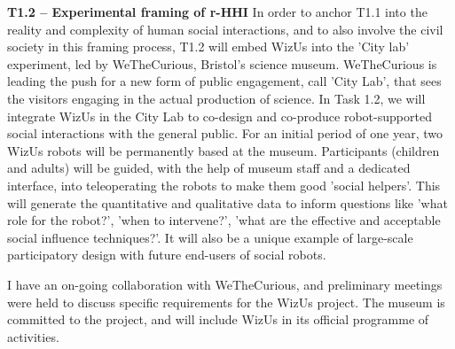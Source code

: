 \documentclass[11pt,a4paper]{report}
\newcommand{\project}{WizUs\xspace}
\begin{document}
\textbf{T1.2 -- Experimental framing of r-HHI} In order to anchor T1.1 into the
reality and complexity of human social interactions, and to also involve the
civil society in this framing process, T1.2 will embed \project into the 'City
lab' experiment, led by WeTheCurious, Bristol's science museum. WeTheCurious is
leading the push for a new form of public engagement, call 'City Lab', that sees
the visitors engaging in the actual production of science. In Task 1.2, we will
integrate \project in the City Lab to co-design and co-produce robot-supported
social interactions with the general public. For an initial period of one year,
two \project robots will be permanently based at the museum.  Participants
(children and adults) will be guided, with the help of museum staff and a
dedicated interface, into teleoperating the robots to make them good 'social
helpers'. This will generate the quantitative and qualitative data to inform
questions like 'what role for the robot?', 'when to intervene?', 'what are the
effective and acceptable social influence techniques?'. It will also be a unique
example of large-scale participatory design with future end-users of social
robots.

I have an on-going collaboration with WeTheCurious, and preliminary meetings
were held to discuss specific requirements for the \project project. The museum
is committed to the project, and will include \project in its official programme of
activities.

% 
% 
% 
% 
% 
% 
% 
% 
% 
\end{document}
